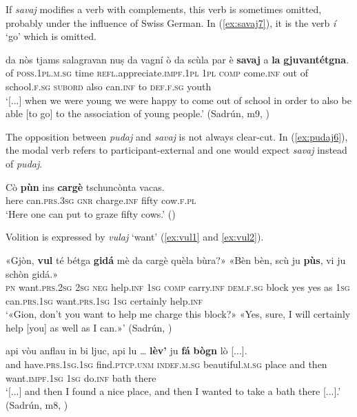 If \textit{savaj} modifies a verb with complements, this verb is sometimes omitted, probably under the influence of Swiss German. In (\ref{ex:savaj7}), it is the verb \textit{í} `go' which is omitted.

\ea
\label{ex:savaj7}
	\gll [...] da nòs tjams salagravan nuṣ da vagní ò da scùla par è \textbf{savaj} {\longrule} {a} \textbf{la} \textbf{gjuvantétgna}.\\
 {} of \textsc{ poss.1pl.m.sg} time \textsc{refl}.appreciate.\textsc{impf.1pl} \textsc{1pl} \textsc{comp} come.\textsc{inf} out of school.\textsc{f.sg} \textsc{subord} also can.\textsc{inf} {} to \textsc{def.f.sg} youth\\
\glt `[...] when we were young we were happy to come out of school in order to also be able [to go] to the association of young people.' (Sadrún, m9, )
\z

The opposition between \textit{pudaj} and \textit{savaj} is not always clear-cut. In (\ref{ex:pudaj6}), the modal verb refers to participant-external  and one would expect \textit{savaj} instead of \textit{pudaj}.

\ea
\label{ex:pudaj6}
\gll   Cò \textbf{pùn} ins \textbf{cargè} tschuncònta vacas.\\
here can.\textsc{prs.3sg} \textsc{gnr} charge.\textsc{inf} fifty cow.\textsc{f.pl}\\
\glt `Here one can put to graze fifty cows.' ()
\z
                               
Volition is expressed by \textit{vulaj} `want' (\ref{ex:vul1} and \ref{ex:vul2}). 

\ea
\label{ex:vul1}
\gll    «Gjòn, \textbf{vul}\footnotemark{} té bétga \textbf{gidá} mè da cargè quèla bùra?» «Bèn bèn, scù ju \textbf{pùs}, vi ju schòn gidá.»\\
\textsc{pn} want.\textsc{prs.2sg} \textsc{2sg} \textsc{neg} help.\textsc{inf} \textsc{1sg} \textsc{comp} carry.\textsc{inf} \textsc{dem.f.sg} block yes yes as \textsc{1sg} can.\textsc{prs.1sg} want.\textsc{prs.1sg} \textsc{1sg} certainly help.\textsc{inf}\\ 
\glt `«Gion, don’t you want to help me charge this block?» «Yes, sure, I will certainly help [you] as well as I can.»' (Sadrún, \citealt[106]{Büchli1966})
\z

\ea
\label{ex:vul2}
\gll  [...] api vòu anflau in bi ljuc, api lu … \textbf{lèv’} ju \textbf{fá} \textbf{bògn} lò [...].\\
{} and have.\textsc{prs.1sg.1sg} find.\textsc{ptcp.unm} \textsc{indef.m.sg} beautiful.\textsc{m.sg} place and then {} want.\textsc{impf.1sg} \textsc{1sg} do.\textsc{inf} bath there\\
\glt `[...] and then I found a nice place, and then I wanted to take a bath there [...].' (Sadrún, m8, )
\z

